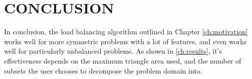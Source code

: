 \chapter{\uppercase {Conclusion}}

In conclusion, the load balancing algorithm outlined in Chapter \ref{ch:motivation} works well for more symmetric problems with a lot of features, and even works well for particularly unbalanced problems. As shown in \ref{ch:results}, it's effectiveness depends on the maximum triangle area used, and the number of subsets the user chooses to decompose the problem domain into. 